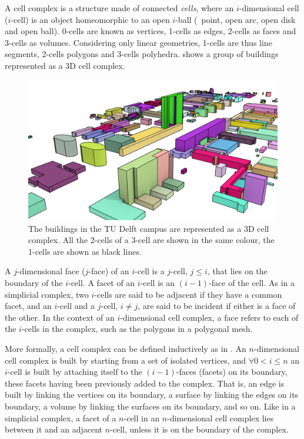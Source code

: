 A cell complex is a structure made of connected \emph{cells}, where an $i$-dimensional cell ($i$-cell) is an object homeomorphic to an open $i$-ball (\ie\ point, open arc, open disk and open ball).
0-cells are known as vertices, 1-cells as edges, 2-cells as faces and 3-cells as volumes.
Considering only linear geometries, 1-cells are thus line segments, 2-cells polygons and 3-cells polyhedra.
 shows a group of buildings represented as a 3D cell complex.
\begin{figure}[tbp]
\centering
\includegraphics[width=\linewidth]{figs/cellscampus}
\caption[The TU Delft campus as a 3D cell complex]{The buildings in the TU Delft campus are represented as a 3D cell complex. All the 2-cells of a 3-cell are shown in the same colour, the 1-cells are shown as black lines.}
\label{fig:cellscampus}
\end{figure}

A $j$-dimensional face ($j$-face) of an $i$-cell is a $j$-cell, $j \leq i$, that lies on the boundary of the $i$-cell.
A facet of an $i$-cell is an $(i-1)$-face of the cell.
As in a simplicial complex, two $i$-cells are said to be adjacent if they have a common facet, and an $i$-cell and a $j$-cell, $i \neq j$, are said to be incident if either is a face of the other.
In the context of an $i$-dimensional cell complex, a face refers to each of the $i$-cells in the complex, such as the polygons in a polygonal mesh.

More formally, a cell complex can be defined inductively as in \citet{Hatcher02}.
An $n$-dimensional cell complex is built by starting from a set of isolated vertices, and $\forall 0 < i \leq n$ an $i$-cell is built by attaching itself to the $(i-1)$-faces (facets) on its boundary, these facets having been previously added to the complex.
That is, an edge is built by linking the vertices on its boundary, a surface by linking the edges on its boundary, a volume by linking the surfaces on its boundary, and so on.
Like in a simplicial complex, a facet of a $n$-cell in an $n$-dimensional cell complex lies between it and an adjacent $n$-cell, unless it is on the boundary of the complex.

